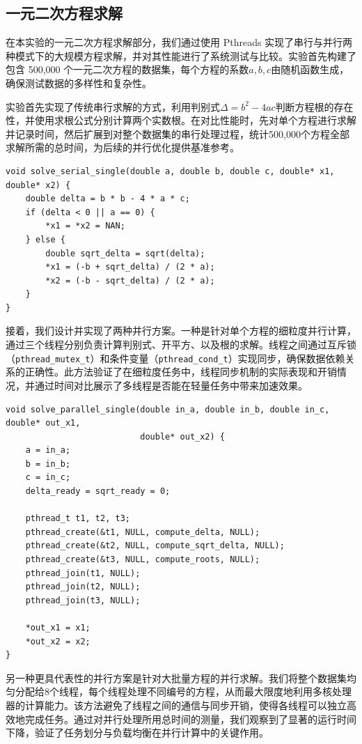 \documentclass[a4paper, utf8]{ctexart}
\begin{document}
	\subsection{一元二次方程求解}
	
	在本实验的一元二次方程求解部分，我们通过使用 Pthreads 实现了串行与并行两种模式下的大规模方程求解，并对其性能进行了系统测试与比较。实验首先构建了包含 500,000 个一元二次方程的数据集，每个方程的系数$a,b,c$由随机函数生成，确保测试数据的多样性和复杂性。
	
	实验首先实现了传统串行求解的方式，利用判别式$\Delta=b^2-4ac$判断方程根的存在性，并使用求根公式分别计算两个实数根。在对比性能时，先对单个方程进行求解并记录时间，然后扩展到对整个数据集的串行处理过程，统计500,000个方程全部求解所需的总时间，为后续的并行优化提供基准参考。
	
	\begin{verbatim}
void solve_serial_single(double a, double b, double c, double* x1, double* x2) {
    double delta = b * b - 4 * a * c;
    if (delta < 0 || a == 0) {
        *x1 = *x2 = NAN;
    } else {
        double sqrt_delta = sqrt(delta);
        *x1 = (-b + sqrt_delta) / (2 * a);
        *x2 = (-b - sqrt_delta) / (2 * a);
    }
}
	\end{verbatim}
	
	接着，我们设计并实现了两种并行方案。一种是针对单个方程的细粒度并行计算，通过三个线程分别负责计算判别式、开平方、以及根的求解。线程之间通过互斥锁（\verb|pthread_mutex_t|）和条件变量（\verb|pthread_cond_t|）实现同步，确保数据依赖关系的正确性。此方法验证了在细粒度任务中，线程同步机制的实际表现和开销情况，并通过时间对比展示了多线程是否能在轻量任务中带来加速效果。
	
	\begin{verbatim}
void solve_parallel_single(double in_a, double in_b, double in_c, double* out_x1,
                           double* out_x2) {
    a = in_a;
    b = in_b;
    c = in_c;
    delta_ready = sqrt_ready = 0;

    pthread_t t1, t2, t3;
    pthread_create(&t1, NULL, compute_delta, NULL);
    pthread_create(&t2, NULL, compute_sqrt_delta, NULL);
    pthread_create(&t3, NULL, compute_roots, NULL);
    pthread_join(t1, NULL);
    pthread_join(t2, NULL);
    pthread_join(t3, NULL);

    *out_x1 = x1;
    *out_x2 = x2;
}
	\end{verbatim}
	
	另一种更具代表性的并行方案是针对大批量方程的并行求解。我们将整个数据集均匀分配给8个线程，每个线程处理不同编号的方程，从而最大限度地利用多核处理器的计算能力。该方法避免了线程之间的通信与同步开销，使得各线程可以独立高效地完成任务。通过对并行处理所用总时间的测量，我们观察到了显著的运行时间下降，验证了任务划分与负载均衡在并行计算中的关键作用。
	
\end{document}
